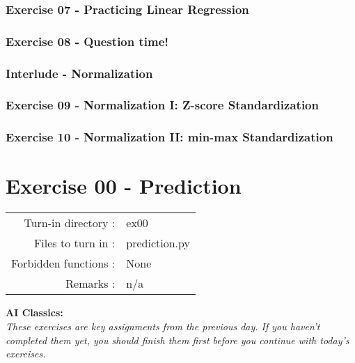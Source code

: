 \documentclass[]{article}
\begin{document}
\hypertarget{exercise-07---practicing-linear-regression}{%
\subsubsection{Exercise 07 - Practicing Linear
Regression}\label{exercise-07---practicing-linear-regression}}

\hypertarget{exercise-08---question-time}{%
\subsubsection{Exercise 08 - Question
time!}\label{exercise-08---question-time}}

\hypertarget{interlude---normalization}{%
\subsubsection{Interlude -
Normalization}\label{interlude---normalization}}

\hypertarget{exercise-09---normalization-i-z-score-standardization}{%
\subsubsection{Exercise 09 - Normalization I: Z-score
Standardization}\label{exercise-09---normalization-i-z-score-standardization}}

\hypertarget{exercise-10---normalization-ii-min-max-standardization}{%
\subsubsection{Exercise 10 - Normalization II: min-max
Standardization}\label{exercise-10---normalization-ii-min-max-standardization}}

\clearpage

\hypertarget{exercise-00---prediction-1}{%
\section{Exercise 00 - Prediction}\label{exercise-00---prediction-1}}

\begin{longtable}[]{@{}rl@{}}
\toprule
\endhead
Turn-in directory : & ex00\tabularnewline
Files to turn in : & prediction.py\tabularnewline
Forbidden functions : & None\tabularnewline
Remarks : & n/a\tabularnewline
\bottomrule
\end{longtable}

\textbf{AI Classics:}\\
\emph{These exercises are key assignments from the previous day. If you
haven't completed them yet, you should finish them first before you
continue with today's exercises.}
\end{document}
